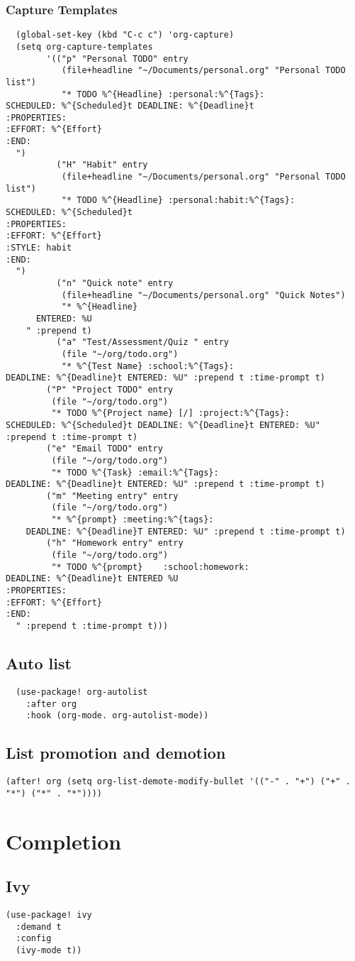 \documentclass[11pt]{article}
\begin{document}
\subsubsection{Capture Templates}
\label{sec:org59ff35b}
\begin{verbatim}
  (global-set-key (kbd "C-c c") 'org-capture)
  (setq org-capture-templates
        '(("p" "Personal TODO" entry
           (file+headline "~/Documents/personal.org" "Personal TODO list")
           "* TODO %^{Headline} :personal:%^{Tags}:
SCHEDULED: %^{Scheduled}t DEADLINE: %^{Deadline}t
:PROPERTIES:
:EFFORT: %^{Effort}
:END:
  ")
          ("H" "Habit" entry
           (file+headline "~/Documents/personal.org" "Personal TODO list")
           "* TODO %^{Headline} :personal:habit:%^{Tags}:
SCHEDULED: %^{Scheduled}t
:PROPERTIES:
:EFFORT: %^{Effort}
:STYLE: habit
:END:
  ")
          ("n" "Quick note" entry
           (file+headline "~/Documents/personal.org" "Quick Notes")
           "* %^{Headline}
      ENTERED: %U
    " :prepend t)
          ("a" "Test/Assessment/Quiz " entry
           (file "~/org/todo.org")
           "* %^{Test Name} :school:%^{Tags}:
DEADLINE: %^{Deadline}t ENTERED: %U" :prepend t :time-prompt t)
        ("P" "Project TODO" entry
         (file "~/org/todo.org")
         "* TODO %^{Project name} [/] :project:%^{Tags}:
SCHEDULED: %^{Scheduled}t DEADLINE: %^{Deadline}t ENTERED: %U" :prepend t :time-prompt t)
        ("e" "Email TODO" entry
         (file "~/org/todo.org")
         "* TODO %^{Task} :email:%^{Tags}:
DEADLINE: %^{Deadline}t ENTERED: %U" :prepend t :time-prompt t)
        ("m" "Meeting entry" entry
         (file "~/org/todo.org")
         "* %^{prompt} :meeting:%^{tags}:
    DEADLINE: %^{Deadline}T ENTERED: %U" :prepend t :time-prompt t)
        ("h" "Homework entry" entry
         (file "~/org/todo.org")
         "* TODO %^{prompt}    :school:homework:
DEADLINE: %^{Deadline}t ENTERED %U
:PROPERTIES:
:EFFORT: %^{Effort}
:END:
  " :prepend t :time-prompt t)))
\end{verbatim}
\subsection{Auto list}
\label{sec:orgc9c2305}
\begin{verbatim}
  (use-package! org-autolist
    :after org
    :hook (org-mode. org-autolist-mode))
\end{verbatim}

\subsection{List promotion and demotion}
\label{sec:orgece422f}
\begin{verbatim}
(after! org (setq org-list-demote-modify-bullet '(("-" . "+") ("+" . "*") ("*" . "*"))))
\end{verbatim}

\section{Completion}
\label{sec:org9d5cb22}

\subsection{Ivy}
\label{sec:orge9f6843}
\begin{verbatim}
(use-package! ivy
  :demand t
  :config
  (ivy-mode t))
\end{verbatim}
\end{document}
